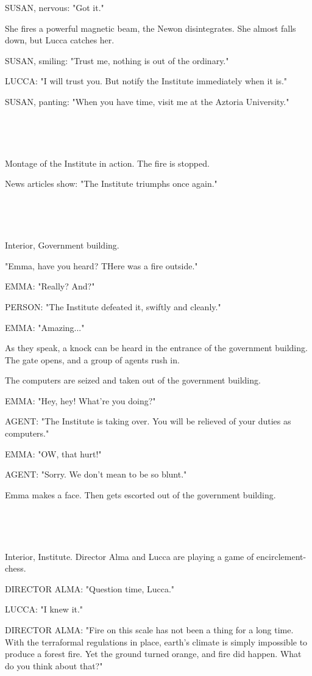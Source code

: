 \documentclass[11pt]{article}
\begin{document}
SUSAN, nervous: "Got it."

She fires a powerful magnetic beam, the Newon disintegrates.
She almost falls down, but Lucca catches her.

SUSAN, smiling: "Trust me, nothing is out of the ordinary."

LUCCA: "I will trust you.
But notify the Institute immediately when it is."

SUSAN, panting: "When you have time, visit me at the Aztoria University."

\ 

\ 

Montage of the Institute in action.
The fire is stopped.

News articles show: "The Institute triumphs once again."

\ 

\ 

Interior, Government building.

"Emma, have you heard? THere was a fire outside."

EMMA: "Really? And?"

PERSON: "The Institute defeated it, swiftly and cleanly."

EMMA: "Amazing..."

As they speak, a knock can be heard in the entrance of the government building.
The gate opens, and a group of agents rush in.

The computers are seized and taken out of the government building.

EMMA: "Hey, hey! What're you doing?"

AGENT: "The Institute is taking over. 
You will be relieved of your duties as computers."

EMMA: "OW, that hurt!"

AGENT: "Sorry. We don't mean to be so blunt."

Emma makes a face. Then gets escorted out of the government building.

\ 

\ 

Interior, Institute.
Director Alma and Lucca are playing a game of encirclement-chess.

DIRECTOR ALMA: "Question time, Lucca."

LUCCA: "I knew it."

DIRECTOR ALMA: "Fire on this scale has not been a thing for a long time.
With the terraformal regulations in place, earth's climate is simply impossible to produce a forest fire.
Yet the ground turned orange, and fire did happen.
What do you think about that?"
\end{document}
